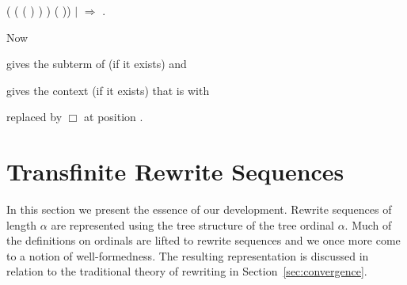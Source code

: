\begin{singlespace}
\begin{coqdoccode}
(
(
 (
) )
)\coqdoceol
\coqdocindent{14.00em}
\coqdoceol
\coqdocindent{14.00em}
( 
))\coqdoceol
\coqdocindent{7.00em}
\coqdoceol
\coqdocindent{5.00em}
\ensuremath{|}
\coqdocvar{\_} \ensuremath{\Rightarrow}
\coqdoceol
\coqdocindent{5.00em}
\coqdoceol
\coqdocindent{3.00em}
\coqdoceol
\coqdocindent{1.00em}
.\coqdoceol
\end{coqdoccode}
\end{singlespace}
Now \begin{coqdoccode}
   \end{coqdoccode} gives the
subterm of  (if it exists)
and \begin{coqdoccode}
   \end{coqdoccode} gives the
context  (if it exists) that is 
with \begin{coqdoccode}
   \end{coqdoccode} replaced by
$\Box$ at position .


\section{Transfinite Rewrite Sequences}\label{sec:seq}

In this section we present the essence of our development. Rewrite
sequences of length $\alpha$ are represented using the tree structure
of the tree ordinal $\alpha$. Much of the definitions on ordinals
are lifted to rewrite sequences and we once more come to a notion of
well-formedness. The resulting representation is discussed in relation
to the traditional theory of rewriting in
Section~\ref{sec:convergence}.

